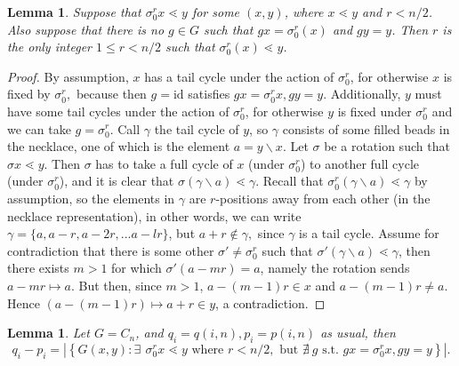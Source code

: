 \documentclass[10 pt]{amsart}
\theoremstyle{plain}
\newtheorem{lem}[thm]{Lemma}
\theoremstyle{definition}
\theoremstyle{remark}
\numberwithin{equation}{section}
\newcommand{\id}{\mathrm{id}}
\begin{document}
\begin{lem}{\label{lem:cyclic_bound_r}}
Suppose that $\sigma_0^r x \lessdot y$ for some $(x,y)$, where $x \lessdot y$ and $r < n/2$. Also suppose that there is no $g \in G$ such that $g x = \sigma_0^r (x)$ and $gy = y$. Then $r$ is the only integer $1 \le r < n/2$ such that $\sigma_0^r (x) \lessdot y$. 
\end{lem}
\begin{proof}

By assumption, $x$ has a tail cycle under the action of $\sigma_0^{r}$, for otherwise $x$ is fixed by $\sigma_0^r,$ because then $g = \id$ satisfies $gx = \sigma_0^rx,gy = y.$ Additionally, $y$ must have some tail cycles under the action of $\sigma_0^r$, for otherwise $y$ is fixed under $\sigma_0^r$  and we can take $g = \sigma_0^r$.  Call $\gamma$ the tail cycle of $y$, so $\gamma$ consists of some filled beads in the necklace, one of which is the element $a = y \backslash x$. Let $\sigma$ be a rotation such that $\sigma x \lessdot y$. Then $\sigma$ has to take a full cycle of $x$ (under $\sigma_0^r$) to another full cycle (under $\sigma_0^r$), and it is clear that $\sigma (\gamma \backslash a) \lessdot \gamma$. Recall that $\sigma_0^r (\gamma \backslash a) \lessdot \gamma$ by assumption, so the elements in $\gamma$ are $r$-positions away from each other (in the necklace representation), in other words, we can write $\gamma = \{ a, a-r, a-2r, ... a -l r\}$, but $a+r \notin \gamma,$ since $\gamma$ is a tail cycle. Assume for contradiction that there is some other $\sigma' \ne \sigma_0^r$ such that $\sigma' (\gamma \backslash a) \lessdot \gamma$, then there exists $m > 1$ for which $\sigma'(a - m r) = a$, namely the rotation sends $a -m r \mapsto a$. But then, since $m > 1$, $a-(m-1)r \in x$ and $a - (m-1) r \ne a$. Hence $(a - (m-1)r) \mapsto a+r \in y$, a contradiction. 

\end{proof}

\begin{lem}{\label{lem:cyclic_counting_difference}} 
Let $G= C_n$, and $q_i = q(i, n), p_i = p(i, n)$ as usual, 
then $$q_i - p_i = |\left\{G{(x, y)} : \exists \: \, \sigma_0^r x \lessdot y \text{ where } r < n/2, \text{ but } \nexists \:  g \text{ s.t. } g x = \sigma_0 ^r x, g y = y \right\}|.$$
\end{lem}
\end{document}

